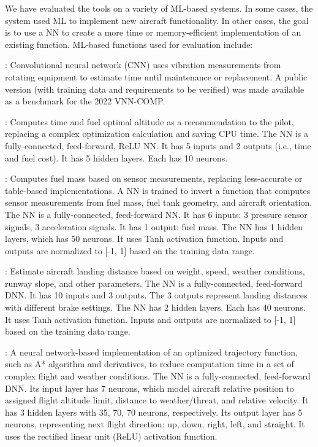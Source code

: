 We have evaluated the tools on a variety of ML-based systems.  In some cases, the system used ML to implement new aircraft functionality.  In other cases, the goal is to use a NN to create a more time or memory-efficient implementation of an existing function.  ML-based functions used for evaluation include:

:  Convolutional neural network (CNN) uses vibration measurements from rotating equipment to estimate time until maintenance or replacement.  A public version (with training data and requirements to be verified) was made available as a benchmark for the 2022 VNN-COMP.


:  Computes time and fuel optimal altitude as a recommendation to the pilot, replacing a complex optimization calculation and saving CPU time. The NN is a fully-connected, feed-forward, ReLU NN. It has 5 inputs and 2 outputs (i.e., time and fuel cost). It has 5 hidden layers. Each has 10 neurons.


:  Computes fuel mass based on sensor measurements, replacing less-accurate or table-based implementations.  A NN is trained to invert a function that computes sensor measurements from fuel mass, fuel tank geometry, and aircraft orientation.  The NN is a fully-connected, feed-forward NN. It has 6 inputs: 3 pressure sensor signals, 3 acceleration signals. It has 1 output: fuel mass. The NN has 1 hidden layers, which has 50 neurons. It uses Tanh activation function. Inputs and outputs are normalized to [-1, 1] based on the training data range.


:  Estimate aircraft landing distance based on weight, speed, weather conditions, runway slope, and other parameters.  The NN is a fully-connected, feed-forward DNN. It has 10 inputs and 3 outputs. The 3 outputs represent landing distances with different brake settings. The NN has 2 hidden layers. Each has 40 neurons. It uses Tanh activation function. Inputs and outputs are normalized to [-1, 1] based on the training data range.


: A neural network-based implementation of an optimized trajectory function, such as A* algorithm and derivatives, to reduce computation time in a set of complex flight and weather conditions. The NN is a fully-connected, feed-forward DNN. Its input layer has 7 neurons, which model aircraft relative position to assigned flight altitude limit, distance to weather/threat, and relative velocity. It has 3 hidden layers with 35, 70, 70 neurons, respectively. Its output layer has 5 neurons, representing next flight direction: up, down, right, left, and straight. It uses the rectified linear unit (ReLU) activation function. 


